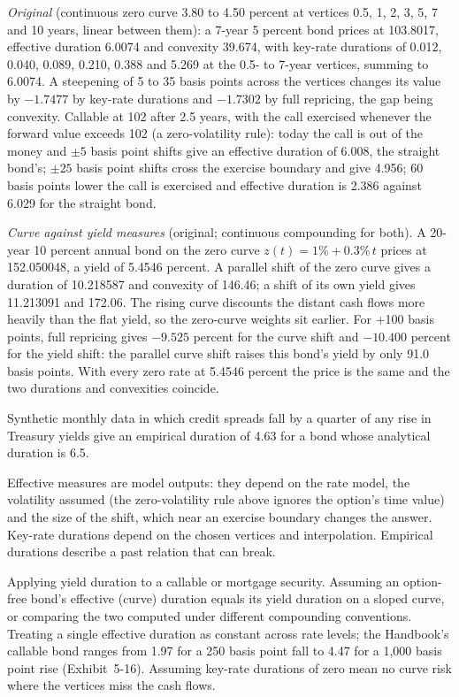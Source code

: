 \begin{qfmethod}
\emph{Original} (continuous zero curve 3.80 to 4.50 percent at vertices 0.5, 1, 2, 3, 5, 7 and 10 years, linear between them): a 7-year 5 percent bond prices at 103.8017, effective duration 6.0074 and convexity 39.674, with key-rate durations of 0.012, 0.040, 0.089, 0.210, 0.388 and 5.269 at the 0.5- to 7-year vertices, summing to 6.0074. A steepening of 5 to 35 basis points across the vertices changes its value by $-1.7477$ by key-rate durations and $-1.7302$ by full repricing, the gap being convexity. Callable at 102 after 2.5 years, with the call exercised whenever the forward value exceeds 102 (a zero-volatility rule): today the call is out of the money and $\pm5$ basis point shifts give an effective duration of 6.008, the straight bond's; $\pm25$ basis point shifts cross the exercise boundary and give 4.956; 60 basis points lower the call is exercised and effective duration is 2.386 against 6.029 for the straight bond.

\emph{Curve against yield measures} (original; continuous compounding for both). A 20-year 10 percent annual bond on the zero curve $z(t)=1\%+0.3\%\,t$ prices at 152.050048, a yield of 5.4546 percent. A parallel shift of the zero curve gives a duration of 10.218587 and convexity of 146.46; a shift of its own yield gives 11.213091 and 172.06. The rising curve discounts the distant cash flows more heavily than the flat yield, so the zero-curve weights sit earlier. For +100 basis points, full repricing gives $-9.525$ percent for the curve shift and $-10.400$ percent for the yield shift: the parallel curve shift raises this bond's yield by only 91.0 basis points. With every zero rate at 5.4546 percent the price is the same and the two durations and convexities coincide.

Synthetic monthly data in which credit spreads fall by a quarter of any rise in Treasury yields give an empirical duration of 4.63 for a bond whose analytical duration is 6.5.

 Effective measures are model outputs: they depend on the rate model, the volatility assumed (the zero-volatility rule above ignores the option's time value) and the size of the shift, which near an exercise boundary changes the answer. Key-rate durations depend on the chosen vertices and interpolation. Empirical durations describe a past relation that can break.

 Applying yield duration to a callable or mortgage security. Assuming an option-free bond's effective (curve) duration equals its yield duration on a sloped curve, or comparing the two computed under different compounding conventions. Treating a single effective duration as constant across rate levels; the Handbook's callable bond ranges from 1.97 for a 250 basis point fall to 4.47 for a 1,000 basis point rise (Exhibit~5-16). Assuming key-rate durations of zero mean no curve risk where the vertices miss the cash flows.


\end{qfmethod}
